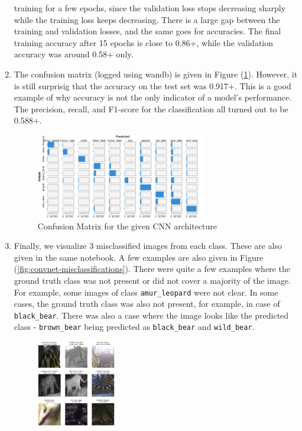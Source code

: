 \documentclass[10pt]{article}
\begin{document}
\begin{enumerate}[label=(\alph*)]
        training for a few epochs, since the validation loss stops decreasing sharply
        while the training loss keeps decreasing. There is a large gap between the training
        and validation losses, and the same goes for accuracies. The final training accuracy
        after 15 epochs is close to 0.86+, while the validation accuracy was around 0.58+ only.
        \item The confusion matrix (logged using wandb) is given in Figure (\ref{fig:convnet-conf-matrix}).
        However, it is still surprisig that the accuracy on the test set was 0.917+. This
        is a good example of why accuracy is not the only indicator of a model's performance.
        The precision, recall, and F1-score for the classification all turned out to be 0.588+.
        \begin{figure}[h!]
            \centering
            \includegraphics[width=0.7\textwidth]{Assets/Classification/Convnet/05}
            \caption{Confusion Matrix for the given CNN architecture}
            \label{fig:convnet-conf-matrix}
        \end{figure}
        \item Finally, we visualize 3 misclassified images from each class. These are also
        given in the same notebook. A few examples are also given in Figure
        (\ref{fig:convnet-misclassifications}). There were quite a few examples where the
        ground truth class was not present or did not cover a majority of the image. For
        example, some images of class \texttt{amur\_leopard} were not clear. In some cases,
        the ground truth class was also not present, for example, in case of \texttt{black\_bear}.
        There was also a case where the image looks like the predicted class - \texttt{brown\_bear}
        being predicted as \texttt{black\_bear} and \texttt{wild\_bear}.
        \begin{figure}[h!]
            \centering
            \includegraphics[width=0.325\textwidth]{Assets/Classification/Convnet/Misclassifications/01}

\end{figure}
\end{enumerate}
\end{document}
